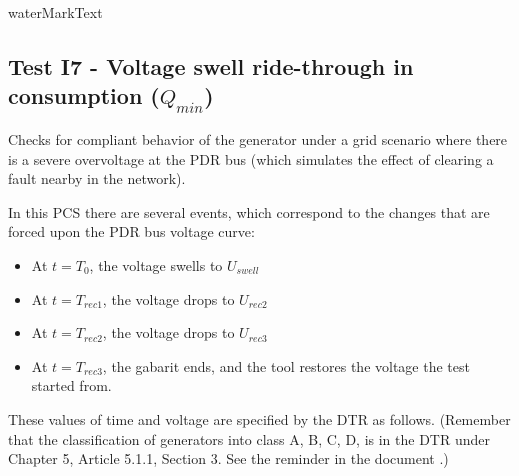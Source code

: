     {{ waterMarkText }}

    \renewcommand{\DTRPcs}{GridVoltageSwell} %
    \renewcommand{\PCSname}{PCS_RTE-I16z3}
    \renewcommand{\OCname}{QMinConsumption}


    \subsection{Test I7 - Voltage swell ride-through in consumption ($Q_{min}$)}

    Checks for compliant behavior of the generator under a grid scenario where
    there is a severe overvoltage at the PDR bus (which simulates the
    effect of clearing a fault nearby in the network).

    \GridCircuitZthree

    In this PCS there are several events, which correspond to the changes that are
    forced upon the PDR bus voltage curve:
    \begin{itemize}
        \item At $t = T_{0}$, the voltage swells to $U_{swell}$
        \item At $t = T_{rec1}$, the voltage drops to $U_{rec2}$
        \item At $t = T_{rec2}$, the voltage drops to $U_{rec3}$
        \item At $t = T_{rec3}$, the gabarit ends, and the tool restores the
        voltage the test started from.
    \end{itemize}
    These values of time and voltage are specified by the DTR as follows. (Remember
    that the classification of generators into class A, B, C, D, is in the DTR under
    Chapter 5, Article 5.1.1, Section 3. See the reminder in the document
    .)

